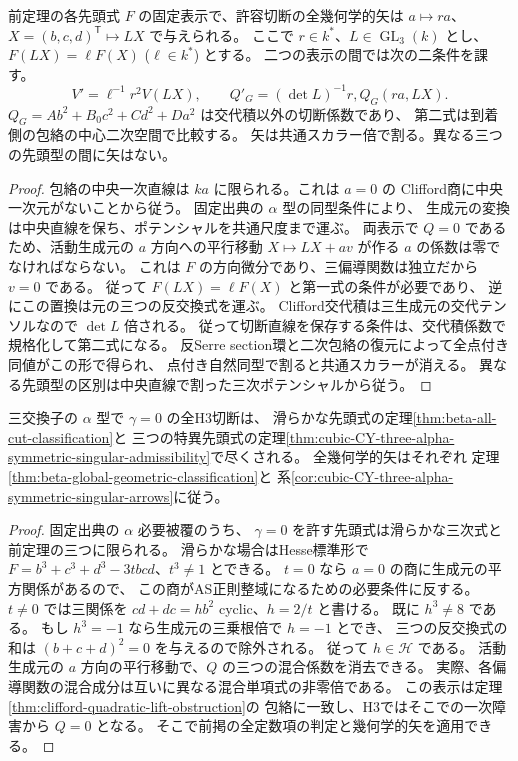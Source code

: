 \begin{corollary}\label{cor:cubic-CY-three-alpha-symmetric-singular-arrows}
前定理の各先頭式 $F$ の固定表示で、許容切断の全幾何学的矢は
$a\mapsto r a$、$X=(b,c,d)^{\mathsf T}\mapsto LX$ で与えられる。
ここで $r\in k^*$、$L\in\operatorname{GL}_3(k)$ とし、
$F(LX)=\ell F(X)$ ($\ell\in k^*$) とする。
二つの表示の間では次の二条件を課す。
\[
 V'=\ell^{-1}r^2 V(LX),\qquad
 Q'_G=(\det L)^{-1}r, Q_G(r a,LX).
\]
$Q_G=A b^2+B_0 c^2+C d^2+D a^2$ は交代積以外の切断係数であり、
第二式は到着側の包絡の中心二次空間で比較する。
矢は共通スカラー倍で割る。異なる三つの先頭型の間に矢はない。
\end{corollary}
\begin{proof}
包絡の中央一次直線は $ka$ に限られる。これは $a=0$ の
Clifford商に中央一次元がないことから従う。
固定出典\cite{AS4CYpinned}の $\alpha$ 型の同型条件により、
生成元の変換は中央直線を保ち、ポテンシャルを共通尺度まで運ぶ。
両表示で $Q=0$ であるため、活動生成元の $a$ 方向への平行移動
$X\mapsto LX+a v$ が作る $a$ の係数は零でなければならない。
これは $F$ の方向微分であり、三偏導関数は独立だから $v=0$ である。
従って $F(LX)=\ell F(X)$ と第一式の条件が必要であり、
逆にこの置換は元の三つの反交換式を運ぶ。
Clifford交代積は三生成元の交代テンソルなので $\det L$ 倍される。
従って切断直線を保存する条件は、交代積係数で規格化して第二式になる。
反Serre section環と二次包絡の復元によって全点付き同値がこの形で得られ、
点付き自然同型で割ると共通スカラーが消える。
異なる先頭型の区別は中央直線で割った三次ポテンシャルから従う。
\end{proof}

\begin{corollary}\label{cor:cubic-CY-three-alpha-symmetric-complete}
三交換子の $\alpha$ 型で $\gamma=0$ の全H3切断は、
滑らかな先頭式の定理\ref{thm:beta-all-cut-classification}と
三つの特異先頭式の定理\ref{thm:cubic-CY-three-alpha-symmetric-singular-admissibility}で尽くされる。
全幾何学的矢はそれぞれ
定理\ref{thm:beta-global-geometric-classification}と
系\ref{cor:cubic-CY-three-alpha-symmetric-singular-arrows}に従う。
\end{corollary}
\begin{proof}
固定出典\cite{AS4CYpinned}の $\alpha$ 必要被覆のうち、
$\gamma=0$ を許す先頭式は滑らかな三次式と前定理の三つに限られる。
滑らかな場合はHesse標準形\cite[Lemma 1]{ADHesse}で
$F=b^3+c^3+d^3-3t bcd$、$t^3\ne1$ とできる。
$t=0$ なら $a=0$ の商に生成元の平方関係があるので、
この商がAS正則整域になるための必要条件に反する。
$t\ne0$ では三関係を $cd+dc=h b^2$ cyclic、$h=2/t$ と書ける。
既に $h^3\ne8$ である。
もし $h^3=-1$ なら生成元の三乗根倍で $h=-1$ とでき、
三つの反交換式の和は $(b+c+d)^2=0$ を与えるので除外される。
従って $h\in\mathcal H$ である。
活動生成元の $a$ 方向の平行移動で、$Q$ の三つの混合係数を消去できる。
実際、各偏導関数の混合成分は互いに異なる混合単項式の非零倍である。
この表示は定理\ref{thm:clifford-quadratic-lift-obstruction}の
包絡に一致し、H3ではそこでの一次障害から $Q=0$ となる。
そこで前掲の全定数項の判定と幾何学的矢を適用できる。
\end{proof}
